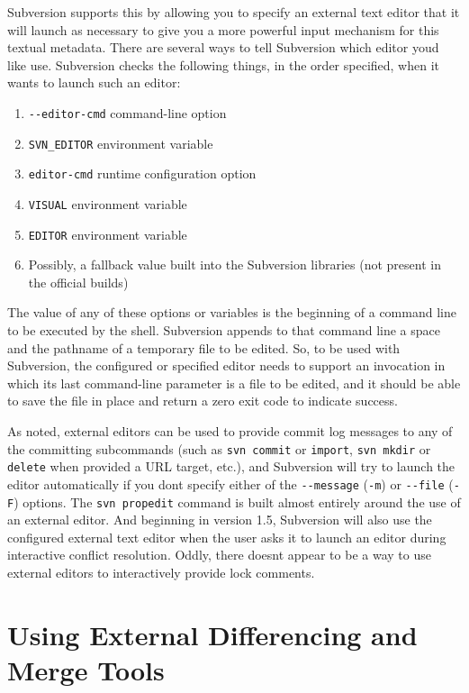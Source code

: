 Subversion supports this by allowing you to specify an external text
editor that it will launch as necessary to give you a more powerful
input mechanism for this textual metadata. There are several ways to
tell Subversion which editor you\textquotesingle d like use. Subversion
checks the following things, in the order specified, when it wants to
launch such an editor:

\begin{enumerate}
\def\labelenumi{\arabic{enumi}.}
\item
  \texttt{-\/-editor-cmd} command-line option
\item
  \texttt{SVN\_EDITOR} environment variable
\item
  \texttt{editor-cmd} runtime configuration option
\item
  \texttt{VISUAL} environment variable
\item
  \texttt{EDITOR} environment variable
\item
  Possibly, a fallback value built into the Subversion libraries (not
  present in the official builds)
\end{enumerate}

The value of any of these options or variables is the beginning of a
command line to be executed by the shell. Subversion appends to that
command line a space and the pathname of a temporary file to be edited.
So, to be used with Subversion, the configured or specified editor needs
to support an invocation in which its last command-line parameter is a
file to be edited, and it should be able to save the file in place and
return a zero exit code to indicate success.

As noted, external editors can be used to provide commit log messages to
any of the committing subcommands (such as \texttt{svn\ commit} or
\texttt{import}, \texttt{svn\ mkdir} or \texttt{delete} when provided a
URL target, etc.), and Subversion will try to launch the editor
automatically if you don\textquotesingle t specify either of the
\texttt{-\/-message} (\texttt{-m}) or \texttt{-\/-file} (\texttt{-F})
options. The \texttt{svn\ propedit} command is built almost entirely
around the use of an external editor. And beginning in version 1.5,
Subversion will also use the configured external text editor when the
user asks it to launch an editor during interactive conflict resolution.
Oddly, there doesn\textquotesingle t appear to be a way to use external
editors to interactively provide lock comments.

\section{Using External Differencing and Merge
Tools}\label{svn.advanced.externaldifftools}

